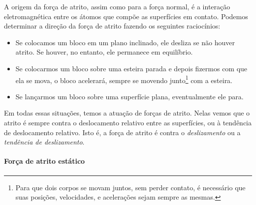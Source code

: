 A origem da força de atrito, assim como para a força normal, é a interação eletromagnética entre os átomos que compõe as superfícies em contato. Podemos determinar a direção da força de atrito fazendo os seguintes raciocínios:
\begin{itemize}
    \item Se colocamos um bloco em um plano inclinado, ele desliza se não houver atrito. Se houver, no entanto, ele permanece em equilíbrio.
    \item Se colocarmos um bloco sobre uma esteira parada e depois fizermos com que ela se mova, o bloco acelerará, sempre se movendo junto\footnote{Para que dois corpos se movam juntos, sem perder contato, é necessário que suas posições, velocidades, e acelerações sejam sempre as mesmas.} com a esteira.
    \item Se lançarmos um bloco sobre uma superfície plana, eventualmente ele para.
\end{itemize}
%
Em todas essas situações, temos a atuação de forças de atrito. Nelas vemos que o atrito é sempre contra o deslocamento relativo entre as superfícies, ou à tendência de deslocamento relativo. Isto é, a força de atrito é contra o \emph{deslizamento} ou a \emph{tendência de deslizamento}.

\paragraph{Força de atrito estático} 

